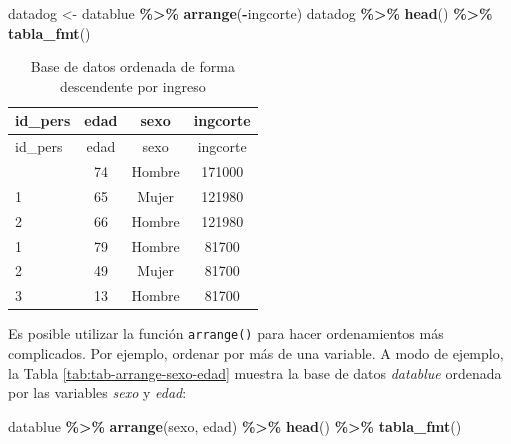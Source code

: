 \documentclass[
  spanish,
  12pt,
]{book}
\newenvironment{Shaded}{\begin{snugshade}}{\end{snugshade}}
\newcommand{\FunctionTok}[1]{\textcolor[rgb]{0.13,0.29,0.53}{\textbf{#1}}}
\newcommand{\NormalTok}[1]{#1}
\newcommand{\OtherTok}[1]{\textcolor[rgb]{0.56,0.35,0.01}{#1}}
\newcommand{\SpecialCharTok}[1]{\textcolor[rgb]{0.81,0.36,0.00}{\textbf{#1}}}
\begin{document}
\begin{Shaded}
\begin{Highlighting}[]
\NormalTok{datadog }\OtherTok{\textless{}{-}}\NormalTok{ datablue }\SpecialCharTok{\%\textgreater{}\%} \FunctionTok{arrange}\NormalTok{(}\SpecialCharTok{{-}}\NormalTok{ingcorte)}
\NormalTok{datadog }\SpecialCharTok{\%\textgreater{}\%} \FunctionTok{head}\NormalTok{() }\SpecialCharTok{\%\textgreater{}\%}
  \FunctionTok{tabla\_fmt}\NormalTok{()}
\end{Highlighting}
\end{Shaded}

\begin{longtable}[]{@{}lccc@{}}
\caption{\label{tab:tab-arrange-ingreso}Base de datos ordenada de forma descendente por ingreso}\tabularnewline
\toprule\noalign{}
id\_pers & edad & sexo & ingcorte \\
\midrule\noalign{}
\endfirsthead
\toprule\noalign{}
id\_pers & edad & sexo & ingcorte \\
\midrule\noalign{}
\endhead
\bottomrule\noalign{}
\endlastfoot
1 & 74 & Hombre & 171000 \\
1 & 65 & Mujer & 121980 \\
2 & 66 & Hombre & 121980 \\
1 & 79 & Hombre & 81700 \\
2 & 49 & Mujer & 81700 \\
3 & 13 & Hombre & 81700 \\
\end{longtable}

Es posible utilizar la función \texttt{arrange()} para hacer ordenamientos más complicados. Por ejemplo, ordenar por más de una variable. A modo de ejemplo, la Tabla \ref{tab:tab-arrange-sexo-edad} muestra la base de datos \emph{datablue} ordenada por las variables \emph{sexo} y \emph{edad}:

\begin{Shaded}
\begin{Highlighting}[]
\NormalTok{datablue }\SpecialCharTok{\%\textgreater{}\%} \FunctionTok{arrange}\NormalTok{(sexo, edad) }\SpecialCharTok{\%\textgreater{}\%} \FunctionTok{head}\NormalTok{() }\SpecialCharTok{\%\textgreater{}\%}
  \FunctionTok{tabla\_fmt}\NormalTok{()}
\end{Highlighting}
\end{Shaded}
\end{document}
